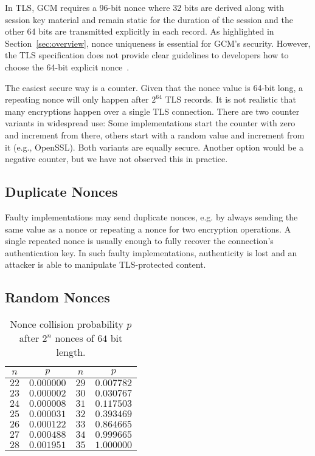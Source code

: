 In TLS, GCM requires a 96-bit nonce where 32 bits are derived along with session key material and remain static for the duration of the session and the other 64 bits are transmitted explicitly in each record.
As highlighted in Section~\ref{sec:overview}, nonce uniqueness is essential for GCM's security. However, the TLS specification does not provide clear guidelines to developers how to choose the 64-bit explicit nonce~\cite{langley2014}.

The easiest secure way is a counter. Given that the nonce value is 64-bit long, a repeating nonce will only happen after $2^{64}$ TLS records. It is not realistic
that many encryptions happen over a single TLS connection. There are two counter variants in widespread use: Some implementations start the counter with zero
and increment from there, others start with a random value and increment from it (e.g., OpenSSL). Both
variants are equally secure.
Another option would be a negative counter, but we have not observed this in practice.

\subsection{Duplicate Nonces}

Faulty implementations may send duplicate nonces, e.g. by always sending the same value as a nonce or repeating
a nonce for two encryption operations. A single repeated nonce is usually enough to fully recover the
connection's authentication key. In such faulty implementations,
authenticity is lost and an attacker is able to manipulate TLS-protected content.

\subsection{Random Nonces}

\begin{table}
\centering
\caption{Nonce collision probability $p$ after $2^n$ nonces of $64$ bit length.}
\label{tab:probabilities}
\begin{tabular}{cc@{\qquad}cc}
\toprule
$n$ & $p$ & $n$ & $p$\\
\midrule
$22$ & $0.000000$ & $29$ & $0.007782$ \\
$23$ & $0.000002$ & $30$ & $0.030767$ \\
$24$ & $0.000008$ & $31$ & $0.117503$ \\
$25$ & $0.000031$ & $32$ & $0.393469$ \\
$26$ & $0.000122$ & $33$ & $0.864665$ \\
$27$ & $0.000488$ & $34$ & $0.999665$ \\
$28$ & $0.001951$ & $35$ & $1.000000$ \\
\bottomrule
\end{tabular}
\end{table}

